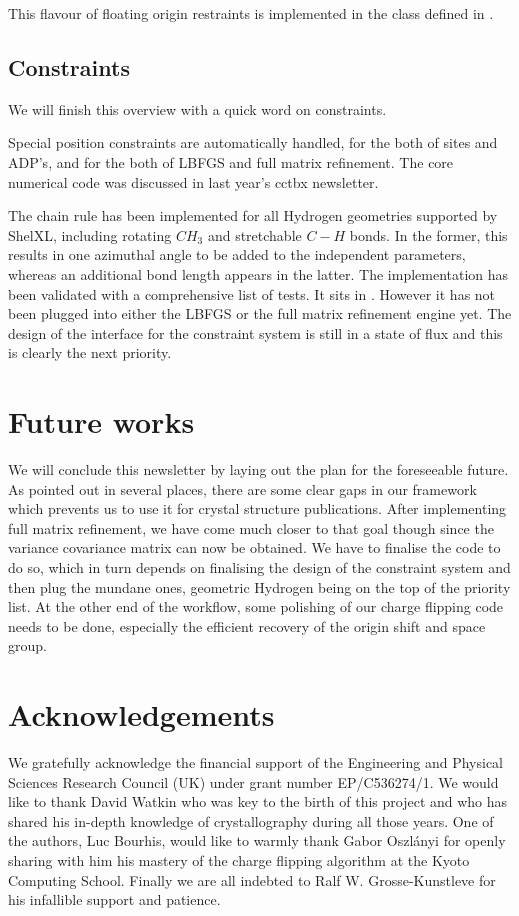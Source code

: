 \documentclass[12pt]{article}
\begin{document}
This flavour of floating origin restraints is implemented in the \cpp class  defined in .

\subsection{Constraints}

We will finish this overview with a quick word on constraints.

Special position constraints are automatically handled, for the both of sites and ADP's, and for the both of LBFGS and full matrix refinement. The core numerical code was discussed in last year's cctbx newsletter.

The chain rule has been implemented for all Hydrogen geometries supported by ShelXL, including rotating $CH_3$ and stretchable $C-H$ bonds. In the former, this results in one azimuthal angle to be added to the independent parameters, whereas an additional bond length appears in the latter. The implementation has been validated with a comprehensive list of tests. It sits in . However it has not been plugged into either the LBFGS or the full matrix refinement engine yet. The design of the interface for the constraint system is still in a state of flux and this is clearly the next priority.


\section{Future works}

We will conclude this newsletter by laying out the plan for the foreseeable future. As pointed out in several places, there are some clear gaps in our framework which prevents us to use it for crystal structure publications. After implementing full matrix refinement, we have come much closer to that goal though since the variance covariance matrix can now be obtained. We have to finalise the code to do so, which in turn depends on finalising the design of the constraint system and then plug the mundane ones, geometric Hydrogen being on the top of the priority list. At the other end of the workflow, some polishing of our charge flipping code needs to be done, especially the efficient recovery of the origin shift and space group.


\section*{Acknowledgements}
We gratefully acknowledge the financial support of the Engineering and Physical Sciences Research Council (UK) under grant number EP/C536274/1. We would like to thank David Watkin who was key to the birth of this project and who has shared his in-depth knowledge of crystallography during all those years. One of the authors, Luc Bourhis, would like to warmly thank Gabor Oszlányi for openly sharing with him his mastery of the charge flipping algorithm at the Kyoto Computing School. Finally we are all indebted to Ralf W. Grosse-Kunstleve for his infallible support and patience.


\end{document}
